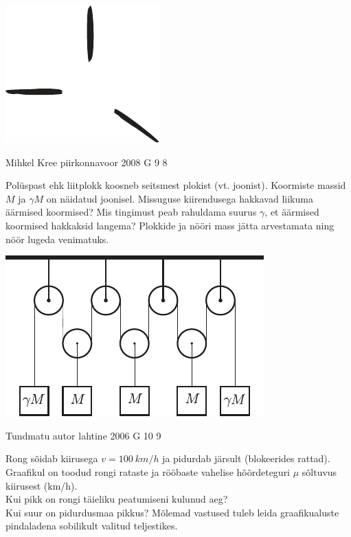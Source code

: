 \documentclass[11pt]{article}
\begin{document}
{{\begin{center}
	\includegraphics[width=0.6\linewidth]{2008-v2g-06-yl}
\end{center}
\fi
}

{Mihkel Kree} %
{piirkonnavoor} %
{2008} %
{G 9} %
{8} %
{
\ifStatement
Polüspast ehk liitplokk koosneb seitsmest plokist (vt. joonist). Koormiste massid $M$ ja $\gamma M$ on näidatud joonisel. Missuguse kiirendusega hakkavad liikuma äärmised koormised? Mis tingimust peab rahuldama suurus $\gamma$, et äärmised koormised hakkaksid langema? Plokkide ja nööri mass jätta arvestamata ning nöör lugeda venimatuks. 

\begin{center}
	\includegraphics[width=0.6\linewidth]{2008-v2g-09-yl}
\end{center}
\fi
}

{Tundmatu autor} %
{lahtine} %
{2006} %
{G 10} %
{9} %
{
\ifStatement
Rong sõidab kiirusega $v = \SI{100}{km/h}$ ja pidurdab järsult (blokeerides rattad). Graafikul on toodud rongi rataste ja rööbaste vahelise hõõrdeteguri $\mu$ sõltuvus kiirusest (\si{km/h}).\\
\osa Kui pikk on rongi täieliku peatumiseni kulunud aeg?\\
\osa Kui suur on pidurdusmaa pikkus? Mõlemad vastused tuleb leida
graafikualuste pindaladena sobilikult valitud teljestikes.

}}
\end{document}

